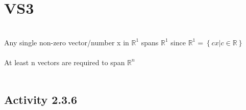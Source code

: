\documentclass{article}
\begin{document}
{\section{VS3}\\

Any single non-zero vector/number x in $\mathbb{R}^{1}$ spans $\mathbb{R}^{1}$ since $\mathbb{R}^{1} = \left\{ cx \big| c\in \mathbb{R} \right\}$\\
\\
At least n vectors are required to span $\mathbb{R}^{n}$\\
\\

\subsection*{Activity 2.3.6}\\

}
\end{document}
